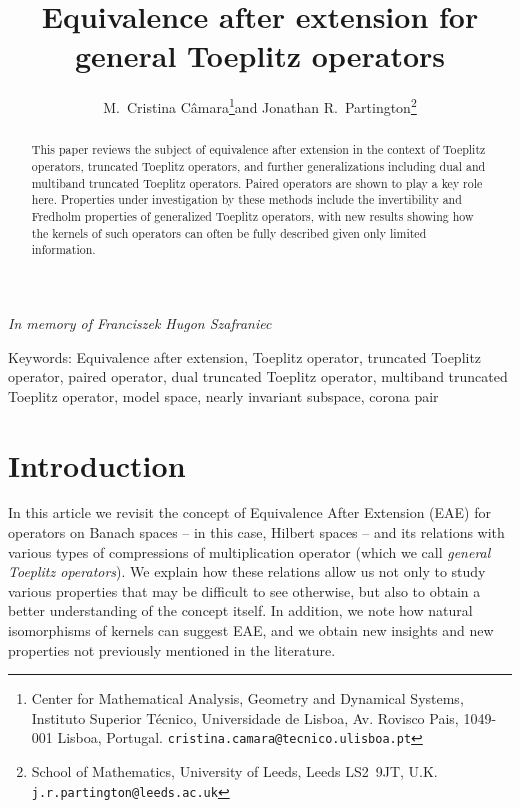 \documentclass[11pt]{article}
\begin{document}
\title{Equivalence after extension for general Toeplitz operators}
\author{M.~Cristina C\^amara\thanks{Center for Mathematical Analysis, Geometry and Dynamical Systems,
Instituto Superior T\'ecnico, Universidade de Lisboa, 
Av. Rovisco Pais,  1049-001 Lisboa, Portugal.   {\tt cristina.camara@tecnico.ulisboa.pt}}\quad  and\quad
Jonathan R.~Partington\thanks{School of Mathematics, University of Leeds, Leeds LS2~9JT, U.K. {\tt j.r.partington@leeds.ac.uk}}}

\date{}

\maketitle
 
\centerline{\em In memory of Franciszek Hugon Szafraniec}

\medskip

\begin{abstract}
This paper reviews the subject of equivalence after extension in the context of Toeplitz operators,
truncated Toeplitz operators, and further generalizations including dual and multiband truncated Toeplitz
operators. Paired operators are shown to play a key role here. Properties under investigation
by these methods
include the invertibility and Fredholm properties of generalized Toeplitz operators, with
new results showing how the kernels of such operators can often be fully described
given only limited information.
 \end{abstract}

\noindent Keywords:
Equivalence after extension, Toeplitz operator, truncated Toeplitz operator, paired operator, dual  truncated Toeplitz operator, multiband truncated Toeplitz operator, model space, nearly invariant subspace, corona pair
 


\section{Introduction}

In this article we revisit the concept of Equivalence After Extension (EAE)
for operators on Banach spaces --   in this case, Hilbert spaces -- and its relations with various types of compressions of multiplication operator (which we call {\em general Toeplitz operators\/}).
We explain how these relations allow us not only to study various
properties that may be difficult to see otherwise, but also to obtain a better understanding of the concept
itself. In addition, we note how natural isomorphisms of kernels can suggest EAE, and we obtain new
insights and new properties not previously mentioned in the literature.
\end{document}
